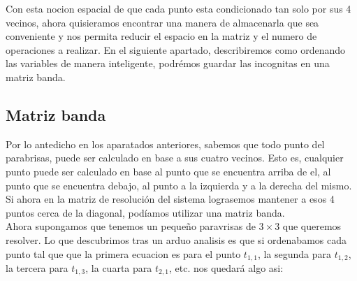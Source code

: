 Con esta nocion espacial de que cada punto esta condicionado tan solo por sus 4 vecinos, ahora quisieramos encontrar una manera de almacenarla que sea conveniente y nos permita reducir el espacio en la matriz y el numero de operaciones a realizar. En el siguiente apartado, describiremos como ordenando las variables de manera inteligente, podrémos guardar las incognitas en una matriz banda.

\subsection{Matriz banda}

Por lo antedicho en los aparatados anteriores, sabemos que todo punto del parabrisas, puede ser calculado en base a sus cuatro vecinos. Esto es, cualquier punto puede ser calculado en base al punto que se encuentra arriba de el, al punto que se encuentra debajo, al punto a la izquierda y a la derecha del mismo. Si ahora en la matriz de resolución del sistema lograsemos mantener a esos 4 puntos cerca de la diagonal, podíamos utilizar una matriz banda.
\\
Ahora supongamos que tenemos un pequeño paravrisas de $3 \times 3$ que queremos resolver. Lo que descubrimos tras un arduo analisis es que si ordenabamos cada punto tal que que la primera ecuacion es para el punto $t_{1,1}$, la segunda para $t_{1,2}$, la tercera para $t_{1,3}$, la cuarta para $t_{2,1}$, etc. nos quedará algo asi:

\setcounter{MaxMatrixCols}{30}

